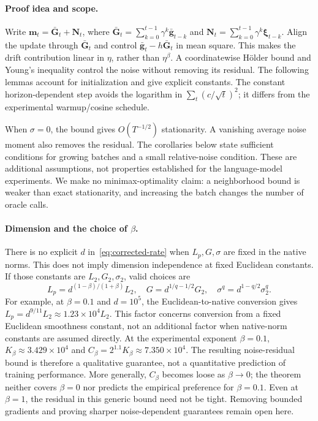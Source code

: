 \documentclass{article}
\begin{document}
\paragraph{Proof idea and scope.}
Write $\mathbf{m}_t=\bar{\mathbf{G}}_t+\mathbf{N}_t$, where $\bar{\mathbf{G}}_t=\sum_{k=0}^{t-1}\gamma^k\bar{\mathbf{g}}_{t-k}$ and $\mathbf{N}_t=\sum_{k=0}^{t-1}\gamma^k\bm{\xi}_{t-k}$. Align the update through $\bar{\mathbf{G}}_t$ and control $\bar{\mathbf{g}}_t-h\bar{\mathbf{G}}_t$ in mean square. This makes the drift contribution linear in $\eta$, rather than $\eta^\beta$. A coordinatewise H\"older bound and Young's inequality control the noise without removing its residual. The following lemmas account for initialization and give explicit constants. The constant horizon-dependent step avoids the logarithm in $\sum_t(c/\sqrt t)^2$; it differs from the experimental warmup/cosine schedule.

When $\sigma=0$, the bound gives $O(T^{-1/2})$ stationarity. A vanishing average noise moment also removes the residual. The corollaries below state sufficient conditions for growing batches and a small relative-noise condition. These are additional assumptions, not properties established for the language-model experiments. We make no minimax-optimality claim: a neighborhood bound is weaker than exact stationarity, and increasing the batch changes the number of oracle calls.

\paragraph{Dimension and the choice of $\beta$.}
There is no explicit $d$ in~\eqref{eq:corrected-rate} when $L_p,G,\sigma$ are fixed in the native norms. This does not imply dimension independence at fixed Euclidean constants. If those constants are $L_2,G_2,\sigma_2$, valid choices are
\begin{equation}\label{eq:dimension-conversion}
L_p=d^{(1-\beta)/(1+\beta)}L_2,\quad
G=d^{1/q-1/2}G_2,\quad
\sigma^q=d^{1-q/2}\sigma_2^q.
\end{equation}
For example, at $\beta=0.1$ and $d=10^5$, the Euclidean-to-native conversion gives $L_p=d^{9/11}L_2\approx1.23\times10^4L_2$. This factor concerns conversion from a fixed Euclidean smoothness constant, not an additional factor when native-norm constants are assumed directly. At the experimental exponent $\beta=0.1$, $K_\beta\approx3.429\times10^4$ and $C_\beta=2^{1.1}K_\beta\approx7.350\times10^4$. The resulting noise-residual bound is therefore a qualitative guarantee, not a quantitative prediction of training performance. More generally, $C_\beta$ becomes loose as $\beta\to0$; the theorem neither covers $\beta=0$ nor predicts the empirical preference for $\beta=0.1$. Even at $\beta=1$, the residual in this generic bound need not be tight. Removing bounded gradients and proving sharper noise-dependent guarantees remain open here.
\end{document}
